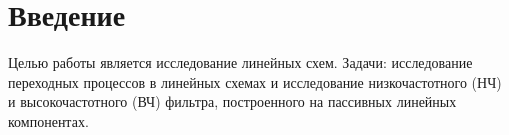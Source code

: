 \section{Введение}

Целью работы является исследование линейных схем.
 Задачи: исследование переходных процессов в линейных схемах и исследование низкочастотного (НЧ) и высокочастотного (ВЧ) фильтра, построенного на пассивных линейных компонентах.
